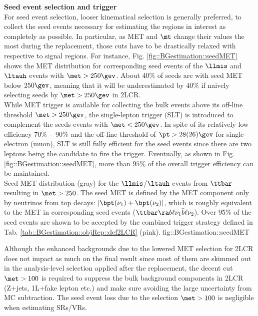 \noindent \textbf{Seed event selection and trigger} \\
For seed event selection, looser kinematical selection is generally preferred, to collect the seed events necessary for estimating the regions in interest as completely as possible. In particular, as MET and $\mt$ change their values the most during the replacement, those cuts have to be drastically relaxed with respective to signal regions. For instance, Fig. \ref{fig::BGestimation::seedMET} shows the MET distribution for corresponding seed events of the $\llmis$ and $\ltauh$ events with $\met>250\gev$. About $40\%$ of seeds are with seed MET below $250\gev$, meaning that it will be underestimated by $40\%$ if naively selecting seeds by $\met>250\gev$ in 2LCR. \\ 

While MET trigger is available for collecting the bulk events above its off-line threshold $\met>250\gev$, the single-lepton trigger (SLT) is introduced to complement the seeds events with $\met<250\gev$.
In spite of its relatively low efficiency $70\%-90\%$ and the off-line threshold of $\pt > 28 (26) \gev$ for single-electron (muon), SLT is still fully efficient for the seed events since there are two leptons being the candidate to fire the trigger. Eventually, as shown in Fig. \ref{fig::BGestimation::seedMET}, more than $95\%$ of the overall trigger efficiency can be maintained. \\

{Seed MET distribution (gray) for the $\llmis$/$\ltauh$ events from $\ttbar$ resulting in $\met>250$. The seed MET is defined by the MET component only by neutrinos from top decays: $\left|\bpt(\nu_1)+\bpt(\nu_2)\right|$, which is roughly equivalent to the MET in corresponding seed events ($\ttbar \ra b\ell\nu_1 \bar{b}\ell\nu_2$). Over $95\%$ of the seed events are shown to be accepted by the combined trigger strategy defined in Tab. \ref{tab::BGestimation::objRep::def2LCR} (pink). }
{fig::BGestimation::seedMET}

Although the enhanced backgrounds due to the lowered MET selection for 2LCR does not impact as much on the final result since most of them are skimmed out in the analysis-level selection applied after the replacement, the decent cut $\met>100$ is required to suppress the bulk background components in 2LCR (Z+jets, 1L+fake lepton etc.) and make sure avoiding the large uncertainty from MC subtraction. The seed event loss due to the selection $\met>100$ is negligible when estimating SRs/VRs.  \\

